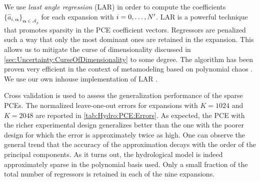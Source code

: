 We use \emph{least angle regression} (LAR) \cite{Statistics:Vidaurre2013,Statistics:Zhang2014} in order to compute the coefficients
\(\{\hat{a}_{i,\bm{\alpha}}\}_{\bm{\alpha} \in \mathcal{A}_p}\) for each expansion with \(i=0,\ldots,N^\prime\).
LAR is a powerful technique that promotes sparsity in the PCE coefficient vectors.
Regressors are penalized such a way that only the most dominant ones are retained in the expansion.
This allows us to mitigate the curse of dimensionality discussed in \cref{sec:Uncertainty:CurseOfDimensionality} to some degree.
The algorithm has been proven very efficient in the context of metamodeling based on polynomial chaos \cite{PCE:Blatman2011}.
We use our own inhouse implementation of LAR \cite{Computing:Uqlab2015:Manual09104}.
\par %
Cross validation is used to assess the generalization performance of the sparse PCEs.
The normalized leave-one-out errors for expansions with \(K=1024\) and \(K=2048\) are reported in \cref{tab:Hydro:PCE:Errors}.
As expected, the PCE with the richer experimental design generalizes better than the one with the poorer design for which the error is approximately twice as high.
One can observe the general trend that the accuracy of the approximation decays with the order of the principal components.
As it turns out, the hydrological model is indeed approximately sparse in the polynomial basis used.
Only a small fraction of the total number of regressors is retained in each of the nine expansions.
\begin{table}[htbp]
  \caption[Normalized leave-one-out errors]{Normalized leave-one-out errors.}
  \label{tab:Hydro:PCE:Errors}
  \centering
\end{table}
